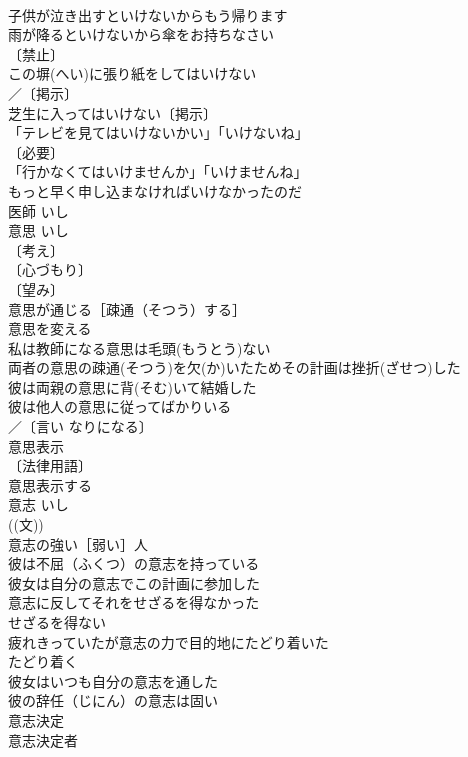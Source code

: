 \documentclass[8pt]{extreport}
\begin{document}
\begin{CJK}{UTF8}{min}
\\	子供が泣き出すといけないからもう帰ります 
\\	雨が降るといけないから傘をお持ちなさい 
\\	〔禁止〕
\\	この塀(へい)に張り紙をしてはいけない 
\\	／〔掲示〕
\\	芝生に入ってはいけない〔掲示〕 
\\	「テレビを見てはいけないかい」「いけないね」 
\\	〔必要〕
\\	「行かなくてはいけませんか」「いけませんね」 
\\	もっと早く申し込まなければいけなかったのだ 
\\	医師	いし	
\\	意思	いし	
\\	〔考え〕
\\	〔心づもり〕
\\	〔望み〕
\\	意思が通じる［疎通（そつう）する］ 
\\	意思を変える 
\\	私は教師になる意思は毛頭(もうとう)ない 
\\	両者の意思の疎通(そつう)を欠(か)いたためその計画は挫折(ざせつ)した 
\\	彼は両親の意思に背(そむ)いて結婚した 
\\	彼は他人の意思に従ってばかりいる 
\\	／〔言い なりになる〕
\\	意思表示 
\\	〔法律用語〕
\\	意思表示する 
\\	意志	いし	
\\	((文)) 
\\	意志の強い［弱い］人 
\\	彼は不屈（ふくつ）の意志を持っている 
\\	彼女は自分の意志でこの計画に参加した 
\\	意志に反してそれをせざるを得なかった 
\\	せざるを得ない 
\\	疲れきっていたが意志の力で目的地にたどり着いた 
\\	たどり着く 
\\	彼女はいつも自分の意志を通した 
\\	彼の辞任（じにん）の意志は固い 
\\	意志決定 
\\	意志決定者 

\end{CJK}
\end{document}
